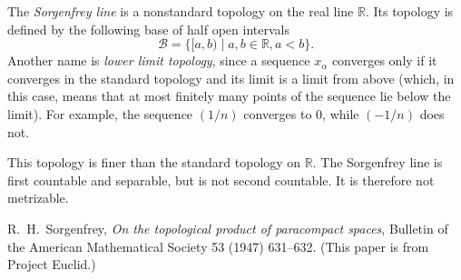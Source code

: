 \documentclass[12pt]{article}
\def\R{\mathbb{R}}
\begin{document}
The \emph{Sorgenfrey line} is a nonstandard topology on the real line $\R$.
Its topology is defined by the following base of half open intervals
\[
  \mathcal{B} = \{ {[a,b)} \mid a,b\in\R, a<b \}.
\]
Another name is \emph{lower limit topology}, since a sequence $x_\alpha$
converges only if it converges in the standard topology and its limit is
a limit from above (which, in this case, means that at most finitely many
points of the sequence lie below the limit). For example, the sequence
$(1/n)$ converges to $0$, while $(-1/n)$ does not.

This topology is finer than the standard topology on $\R$.
The Sorgenfrey line is first countable and separable, but is not second countable.
It is therefore not metrizable.

\begin{thebibliography}{9}
 R.~H.~Sorgenfrey,
 {\it On the topological product of paracompact spaces},
 Bulletin of the American Mathematical Society 53 (1947) 631--632.
 (This paper is
 from Project Euclid.)
\end{thebibliography}
\end{document}
